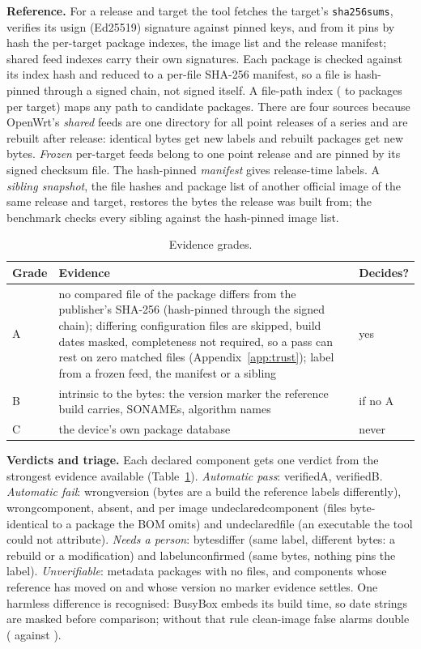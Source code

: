 \documentclass[sigconf,nonacm]{acmart}
\newcommand{\ubreak}{\textunderscore\allowbreak}
\newcommand{\vd}[1]{{\ttfamily\let\_\ubreak #1}}
\begin{document}
\textbf{Reference.} For a release and target the tool fetches the target's \texttt{sha256sums}, verifies its usign (Ed25519) signature against pinned keys, and from it pins by hash the per-target package indexes, the image list and the release manifest; shared feed indexes carry their own signatures. Each package is checked against its index hash and reduced to a per-file SHA-256 manifest, so a file is hash-pinned through a signed chain, not signed itself. A file-path index (\indexPkgsMin{} to \indexPkgsMax{} packages per target) maps any path to candidate packages. There are four sources because OpenWrt's \emph{shared} feeds are one directory for all point releases of a series and are rebuilt after release: identical bytes get new labels and rebuilt packages get new bytes. \emph{Frozen} per-target feeds belong to one point release and are pinned by its signed checksum file. The hash-pinned \emph{manifest} gives release-time labels. A \emph{sibling snapshot}, the file hashes and package list of another official image of the same release and target, restores the bytes the release was built from; the benchmark checks every sibling against the hash-pinned image list.

\begin{table}[t]
\caption{Evidence grades.}
\label{tab:grades}
\small
\begin{tabular}{@{}lp{}l@{}}
\toprule
Grade & Evidence & Decides? \\
\midrule
A & no compared file of the package differs from the publisher's SHA-256 (hash-pinned through the signed chain); differing configuration files are skipped, build dates masked, completeness not required, so a pass can rest on zero matched files (Appendix~\ref{app:trust}); label from a frozen feed, the manifest or a sibling & yes \\
B & intrinsic to the bytes: the version marker the reference build carries, SONAMEs, algorithm names & if no A \\
C & the device's own package database & never \\
\bottomrule
\end{tabular}
\end{table}

\textbf{Verdicts and triage.} Each declared component gets one verdict from the strongest evidence available (Table~\ref{tab:grades}).
\emph{Automatic pass}: \vd{verified\_A}, \vd{verified\_B}.
\emph{Automatic fail}: \vd{wrong\_version} (bytes are a build the reference labels differently), \vd{wrong\_component}, \vd{absent}, and per image \vd{undeclared\_component} (files byte-identical to a package the BOM omits) and \vd{undeclared\_file} (an executable the tool could not attribute).
\emph{Needs a person}: \vd{bytes\_differ} (same label, different bytes: a rebuild or a modification) and \vd{label\_unconfirmed} (same bytes, nothing pins the label).
\emph{Unverifiable}: metadata packages with no files, and components whose reference has moved on and whose version no marker evidence settles.
One harmless difference is recognised: BusyBox embeds its build time, so date strings are masked before comparison; without that rule clean-image false alarms double (\cleanFpNoNorm{} against \cleanAlarms{}).
\end{document}
